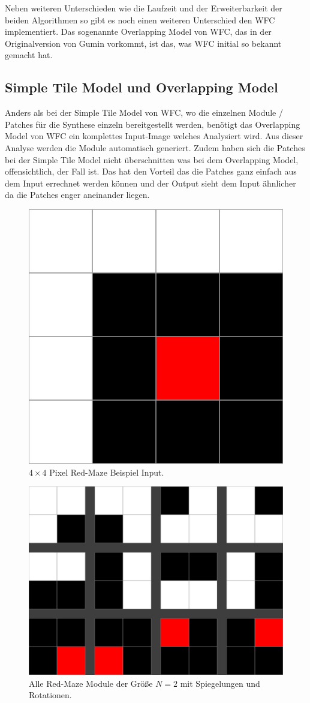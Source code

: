 \documentclass[12pt, a4paper,twoside,openright]{report} %
\begin{document}
Neben weiteren Unterschieden wie die Laufzeit und der Erweiterbarkeit der beiden Algorithmen so gibt es noch einen weiteren Unterschied den WFC implementiert.
Das sogenannte Overlapping Model von WFC, das in der Originalversion von Gumin vorkommt, ist das, was WFC initial so bekannt gemacht hat.

\subsection{Simple Tile Model und Overlapping Model}

Anders als bei der Simple Tile Model von WFC, wo die einzelnen Module / Patches für die Synthese einzeln bereitgestellt werden,
benötigt das Overlapping Model von WFC ein komplettes Input-Image welches Analysiert wird.
Aus dieser Analyse werden die Module automatisch generiert.
Zudem haben sich die Patches bei der Simple Tile Model nicht überschnitten was bei dem Overlapping Model, offensichtlich, der Fall ist.
Das hat den Vorteil das die Patches ganz einfach aus dem Input errechnet werden können und der Output sieht dem Input ähnlicher da die Patches enger aneinander liegen. \cite{merrell2018compare}

\begin{figure}[H]
    \centering
    \includegraphics[width=0.5\linewidth]{images/red-maze.jpg}%
    \caption{$4\times 4$ Pixel Red-Maze Beispiel Input. \cite{Karth2017WaveFunctionCollapseIC}}%
\end{figure}


\begin{figure}[H]
    \centering
    \includegraphics[width=0.5\linewidth]{images/red-maze-modules.jpg}%
    \caption{Alle Red-Maze Module der Größe $N = 2$ mit Spiegelungen und Rotationen. \cite{Karth2017WaveFunctionCollapseIC}}%
\end{figure}
\end{document}
